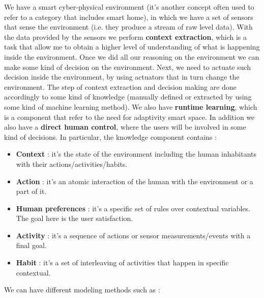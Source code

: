 \documentclass[11pt]{article}
\begin{document}
We have a smart cyber-physical environment (it's another concept often used to refer to a category that includes smart home), in which we have a set of sensors that sense the environment (i.e. they produce a stream of raw level data). With the data provided by the sensors we perform \textbf{context extraction}, which is a task that allow me to obtain a higher level of understanding of what is happening inside the environment. Once we did all our reasoning on the environment we can make some kind of decision on the environment. Next, we need to actuate such decision inside the environment, by using actuators that in turn change the environment. The step of context extraction and decision making are done accordingly to some kind of knowledge (manually defined or extracted by using some kind of machine learning method). We also have \textbf{runtime learning}, which is a component that refer to the need for adaptivity smart space. In addition we also have a \textbf{direct human control}, where the users will be involved in some kind of decisions. In particular, the knowledge component contains :

\begin{itemize}
\item \textbf{Context} : it's the state of the environment including the human inhabitants with their actions/activities/habits.

\item \textbf{Action} : it's an atomic interaction of the human with the environment or a part of it.

\item \textbf{Human preferences} : it's a specific set of rules over contextual variables. The goal here is the user satisfaction.

\item \textbf{Activity} : it's a sequence of actions or sensor measurements/events with a final goal.

\item \textbf{Habit} : it's a set of interleaving of activities that happen in specific contextual.
\end{itemize}

We can have different modeling methods such as :
\end{document}
